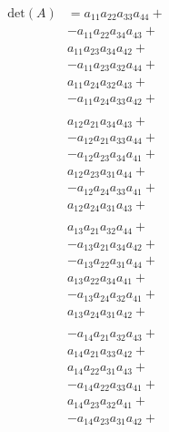 \documentclass[letterpaper,12pt]{article}
\theoremstyle{definition}
\begin{document}
\begin{align*}
    \text{det}(A) &= a_{11}a_{22}a_{33}a_{44} + \\
    & -a_{11}a_{22}a_{34}a_{43} + \\
    & a_{11}a_{23}a_{34}a_{42} + \\
    & -a_{11}a_{23}a_{32}a_{44} + \\
    & a_{11}a_{24}a_{32}a_{43} + \\
    & -a_{11}a_{24}a_{33}a_{42} + \\
    \\
    & a_{12}a_{21}a_{34}a_{43} + \\
    & -a_{12}a_{21}a_{33}a_{44} + \\
    & -a_{12}a_{23}a_{34}a_{41} + \\
    & a_{12}a_{23}a_{31}a_{44} + \\
    & -a_{12}a_{24}a_{33}a_{41} + \\
    & a_{12}a_{24}a_{31}a_{43} + \\
    \\
    & a_{13}a_{21}a_{32}a_{44} + \\
    & -a_{13}a_{21}a_{34}a_{42} + \\
    & -a_{13}a_{22}a_{31}a_{44} + \\
    & a_{13}a_{22}a_{34}a_{41} + \\
    & -a_{13}a_{24}a_{32}a_{41} + \\
    & a_{13}a_{24}a_{31}a_{42} + \\
    \\
    & -a_{14}a_{21}a_{32}a_{43} + \\
    & a_{14}a_{21}a_{33}a_{42} + \\
    & a_{14}a_{22}a_{31}a_{43} + \\
    & -a_{14}a_{22}a_{33}a_{41} + \\
    & a_{14}a_{23}a_{32}a_{41} + \\
    & -a_{14}a_{23}a_{31}a_{42} + \\
    \\
    \end{align*}
\end{document}
